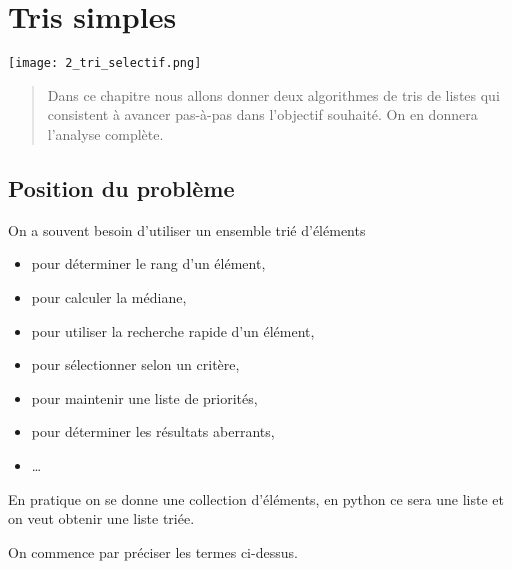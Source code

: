 \chapter{Tris simples}

\begin{center}
\texttt{[image: 2\_tri\_selectif.png]}   
\end{center}

\medskip

\begin{abstract}
    Dans ce chapitre nous allons donner deux algorithmes de tris de listes qui consistent à avancer pas-à-pas dans l'objectif souhaité. On en donnera l'analyse complète.
\end{abstract}
\section{Position du problème}
On a souvent besoin d'utiliser un ensemble trié d'éléments

\begin{itemize}
  \item pour déterminer le rang d'un élément,
  \item pour calculer la médiane,
  \item pour utiliser la recherche rapide d'un élément,
  \item pour sélectionner selon un critère,
  \item pour maintenir une liste de priorités,
  \item pour déterminer les résultats aberrants,
  \item \dots
\end{itemize}

\medskip

En pratique on se donne une collection d'éléments, en python ce sera une liste et on veut obtenir une liste triée.

On commence par préciser les termes ci-dessus.

